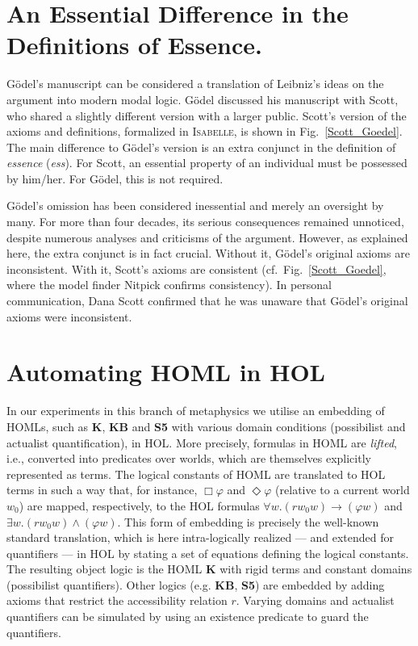 \documentclass{llncs}
\newcommand{\imp}{{\rightarrow}}
\begin{document}
\section{An Essential Difference in the Definitions of Essence.}
\label{sec:history}
G\"odel's manuscript can be considered a translation of Leibniz's
ideas on the argument into modern modal logic. G\"odel
discussed his manuscript with Scott, who shared a slightly different
version with a larger public. Scott's version of the axioms and
definitions, formalized in \textsc{Isabelle}, is shown in
Fig.~\ref{Scott_Goedel}. 
The main difference to G\"odel's version is an
extra conjunct in the definition of \emph{essence} (\emph{ess}). For Scott,
an essential property of an individual must be possessed by
him/her. For G\"odel, this is not required. 


G\"odel's omission has been
considered inessential and merely an oversight by many. 
For more than four decades, its serious consequences remained unnoticed, 
despite numerous analyses and criticisms of the
argument.
However, as explained here, the extra conjunct is in
fact crucial. Without it, G\"odel's original axioms are
inconsistent. With it, Scott's axioms are consistent (cf.~Fig.~\ref{Scott_Goedel},
where the model finder Nitpick \cite{Nitpick} confirms consistency). In
personal communication, Dana Scott confirmed that he was unaware
that G\"odel's original axioms were inconsistent.









\section{Automating HOML in HOL}\label{sec:homlinhol}



In our experiments in this branch of metaphysics we
utilise an embedding of HOMLs, such as \textbf{K}, \textbf{KB} and
\textbf{S5} with various domain conditions (possibilist and actualist
quantification), in HOL. More precisely, formulas in HOML are \emph{lifted}, i.e., converted
into predicates over worlds, which are themselves explicitly
represented as terms. The logical constants of HOML are translated to
HOL terms in such a way that, for instance,
$\Box \varphi$ and $\Diamond \varphi$ (relative to a current world
$w_0$) are mapped, respectively, to the HOL formulas
$\forall w. (r w_0 w) \imp (\varphi w)$ and
$\exists w. (r w_0 w) \wedge (\varphi w)$. This form of embedding is
precisely the well-known standard translation,
which is here intra-logically realized --- and extended for
quantifiers --- in HOL by stating a set of equations defining the
logical constants. The resulting object logic is
the HOML \textbf{K} with rigid terms and constant domains (possibilist
quantifiers). Other logics (e.g. \textbf{KB}, \textbf{S5}) are
embedded by adding axioms that restrict the accessibility relation
$r$. Varying domains and actualist quantifiers can be simulated by
using an existence predicate to guard the quantifiers. 
\end{document}
